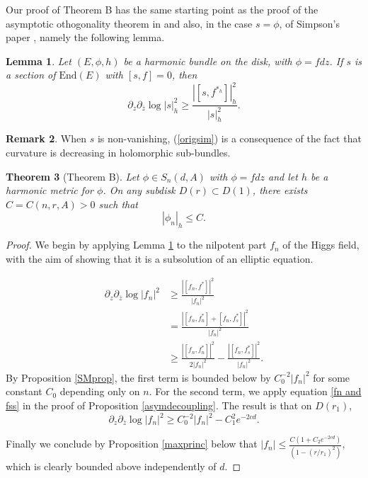 \documentclass[10pt]{amsart}
\newtheorem{thm}{Theorem}[section]
\newtheorem{lem}[thm]{Lemma}
\theoremstyle{definition}
\newtheorem{remark}[thm]{Remark}
\begin{document}
Our proof of Theorem B has the same starting point as the proof of the asymptotic othogonality theorem in \cite{Mo} and also, in the case $s = \phi$, of Simpson's paper \cite[page 729]{S}, namely the following lemma.

\begin{lem} \cite[Lemma 2.4]{Mo} \label{lem: origsim}
Let $(E,\phi,h)$ be a harmonic bundle on the disk, with $\phi = fdz$. If $s$ is a section of $\mathrm{End}(E)$ with $[s,f] = 0 $, then
\begin{equation}\label{origsim}
    \partial_z\partial_{\overline{z}}\log |s|_{h}^2\geq \frac{|[s,f^{*_h}]|_h^2}{|s|_h^2}.
\end{equation}
\end{lem}

\begin{remark}
When $s$ is non-vanishing, (\ref{origsim}) is a consequence of the fact that curvature is decreasing in holomorphic sub-bundles.
\end{remark}


\begin{thm}[Theorem B]
 Let $\phi \in S_n(d,A)$ with $\phi=fdz$ and let $h$ be a harmonic metric for $\phi$. On any subdisk $D(r)\subset D(1)$, there exists $C=C(n,r,A)>0$ such that
$$|\phi_n|_h\leq C.$$
\end{thm}

\begin{proof}
We begin by applying Lemma \ref{lem: origsim} to the nilpotent part $f_n$ of the Higgs field, with the aim of showing that it is a subsolution of an elliptic equation.

\begin{align*}
        \partial_z \partial_{\overline{z}} \log |f_n|^2 &\geq \frac {|[f_n,f^*]|^2}{|f_n|^2} \\
        &= \frac{|[f_n, f_n^*] + [f_n, f_s^*]|^2}{|f_n|^2} \\
        &\geq \frac{|[f_n, f_n^*]|^2}{2|f_n|^2} - \frac{|[f_n, f_s^*]|^2}{|f_n|^2}.
\end{align*}
By Proposition \ref{SMprop}, the first term is bounded below by $C_0^{-2} |f_n|^2$ for some constant $C_0$ depending only on $n$. For the second term, we apply equation \eqref{fn and fss} in the proof of Proposition \ref{asymdecoupling}. The result is that on $D(r_1)$, 
\[
\partial_z \partial_{\overline{z}} \log |f_n|^2 \geq C_0^{-2}|f_n|^2 - C_1^2e^{-2cd}. 
\]

Finally we conclude by Proposition \ref{maxprinc} below that $|f_n| \leq \frac{C(1 + C_2e^{-2cd})}{(1-(r/r_1)^2)},$
which is clearly bounded above independently of $d$.

    
\end{proof}
\end{document}
